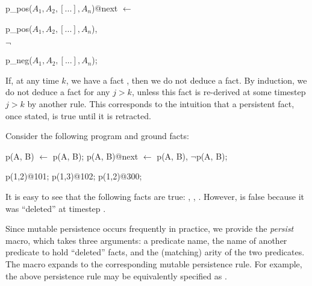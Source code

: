 \begin{dedalus}
p\_pos($A_1,A_2,[...],A_n$)@next $\leftarrow$
\end{dedalus}

\hspace{5mm}
\begin{dedalus}
p\_pos($A_1,A_2,[...],A_n$),
\end{dedalus}

\hspace{5mm}
$\lnot$
\begin{dedalus}
p\_neg($A_1,A_2,[...],A_n$);
\end{dedalus}

%
%
\noindent
If, at any time $k$, we have a fact
, then we do not deduce a
 fact.  By induction, we do not
deduce a  fact for any $j > k$, unless
this  fact is re-derived at some timestep $j > k$ by another
rule.  This corresponds to the intuition that a persistent fact, once stated,
is true until it is retracted.  

\begin{example}
Consider the following \slang program and ground facts:

\begin{Dedalus}
p\pos(A, B) \(\leftarrow\) p(A, B);
p\pos(A, B)@next \(\leftarrow\) p\pos(A, B), \(\lnot\)p\nega(A, B);

p(1,2)@101;
p(1,3)@102;
p\nega(1,2)@300;
\end{Dedalus}

It is easy to see that the following facts are true: ,
, .  However,  is
false because it was ``deleted'' at timestep .
\end{example}

Since mutable persistence occurs frequently in practice, we provide the {\em
persist} macro, which takes three arguments: a predicate name, the name of another predicate to hold ``deleted'' facts, and the (matching) arity of the two predicates. The macro
expands to the corresponding mutable persistence rule.  For example, the above
 persistence rule may be equivalently specified as
.

